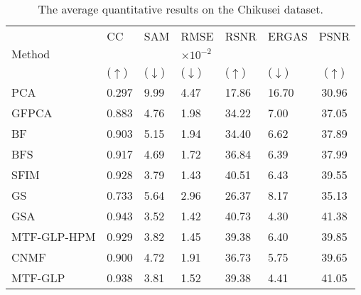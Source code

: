 \documentclass[journal]{IEEEtran}
\begin{document}
    \begin{table}[tb]
        \centering
        \caption{The average quantitative results on the Chikusei dataset.}
        \begin{tabular}{lp{0.5cm}p{0.5cm}p{0.6cm}p{0.5cm}p{0.6cm}c}
        \hline
        \multirow{3}{*}{Method}         & CC                & SAM               & RMSE                  & RSNR              & ERGAS             & PSNR  \\
                                        &                   &                   &  $\times 10^{-2}$     &                   &                   & \\
                                        & ($\uparrow$)      & ($\downarrow$)    &  ($\downarrow$)       & ($\uparrow$)      & ($\downarrow$)    & ($\uparrow$)\\
        \hline
        PCA\cite{PCA1}                  & 0.297            & 9.99            & 4.47            & 17.86           & 16.70            & 30.96\\
        GFPCA \cite{GFPCA}              & 0.883            & 4.76            & 1.98            & 34.22           & 7.00            & 37.05\\
        BF \cite{BF}                    & 0.903            & 5.15            & 1.94            & 34.40           & 6.62            & 37.89\\
        BFS \cite{BFS}                  & 0.917            & 4.69            & 1.72            & 36.84           & 6.39            & 37.99\\
        SFIM \cite{SFIM}                & 0.928            & 3.79            & 1.43            & 40.51           & 6.43            & 39.55\\
        GS\cite{GS}                     & 0.733            & 5.64            & 2.96            & 26.37           & 8.17            & 35.13\\
        GSA\cite{GS}                    & 0.943            & 3.52            & 1.42            & 40.73           & 4.30            & 41.38\\
        MTF-GLP-HPM \cite{MTF-GLP-HPM}  & 0.929            & 3.82            & 1.45            & 39.38           & 6.40            & 39.85\\
        CNMF \cite{CNMF}                & 0.900            & 4.72            & 1.91            & 36.73           & 5.75            & 39.65\\
        MTF-GLP \cite{MTF-GLP}          & 0.938            & 3.81            & 1.52            & 39.38           & 4.41            & 41.05\\

\end{tabular}
\end{table}
\end{document}
